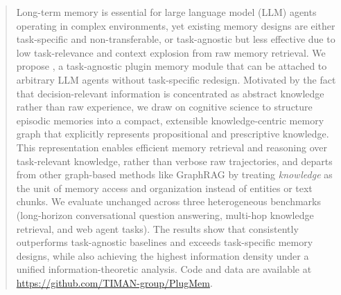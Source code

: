 \begin{abstract}
Long-term memory is essential for large language model (LLM) agents operating in complex environments, yet existing memory designs are either task-specific and non-transferable, or task-agnostic but less effective due to low task-relevance and context explosion from raw memory retrieval.
We propose \plugmem, a task-agnostic plugin memory module that can be attached to arbitrary LLM agents without task-specific redesign. 
Motivated by the fact that decision-relevant information is concentrated as abstract knowledge rather than raw experience, we draw on cognitive science to structure episodic memories into a compact, extensible knowledge-centric memory graph that explicitly represents propositional and prescriptive knowledge.
This representation enables efficient memory retrieval and reasoning over task-relevant knowledge, rather than verbose raw trajectories, and departs from other graph-based methods like GraphRAG by treating \textit{knowledge} as the unit of memory access and organization instead of entities or text chunks. 
We evaluate \plugmem unchanged across three heterogeneous benchmarks (long-horizon conversational question answering, multi-hop knowledge retrieval, and web agent tasks). 
The results show that \plugmem consistently outperforms task-agnostic baselines and exceeds task-specific memory designs, while also achieving the highest information density under a unified information-theoretic analysis. Code and data are available at \href{https://github.com/TIMAN-group/PlugMem}{https://github.com/TIMAN-group/PlugMem}.

\end{abstract}
